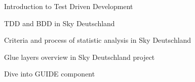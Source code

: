 \begin{cventries}
  \cventryS
    {
        \begin{cvitems}
        \item {Introduction to Test Driven Development}
        \item {TDD and BDD in Sky Deutschland}
        \item{Criteria and process of statistic analysis in Sky Deutschland}
        \item{Glue layers overview in Sky Deutschland project}
        \item{Dive into GUIDE component}
        \end{cvitems}
    }
\end{cventries}
